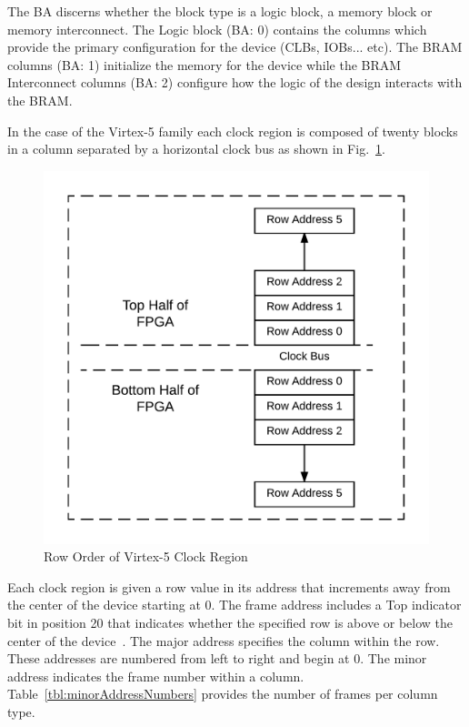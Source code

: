 \documentclass[conference]{IEEEtran}
\begin{document}
The \acrfull{BA} discerns whether the block type is a logic block, a memory block or memory interconnect.
The Logic block (BA: 0) contains the columns which provide the primary configuration for the device (\acrshort{CLBs}, \acrshort{IOBs}... etc).
The \acrshort{BRAM} columns (BA: 1) initialize the memory for the device while the \acrshort{BRAM} Interconnect columns (BA: 2) configure how the logic of the design interacts with the \acrshort{BRAM}.

In the case of the Virtex-5 family each clock region is composed of twenty blocks in a column separated by a horizontal clock bus as shown in Fig.~\ref{fig:RowOrder}.
\begin{figure}[h]
	\centering
	\includegraphics[width=1\linewidth]{../Thesis/Figures/RowOrder}
	\caption[Row Order of Virtex-5 Clock Region]{Row Order of Virtex-5 Clock Region}
	\label{fig:RowOrder}
\end{figure}

Each clock region is given a row value in its address that increments away from the center of the device starting at 0. 
The frame address includes a Top indicator bit in position 20 that indicates whether the specified row is above or below the center of the device~\cite{virtex5ConfigGuide}.
The major address specifies the column within the row.
These addresses are numbered from left to right and begin at 0.
The minor address indicates the frame number within a column. 
Table~\ref{tbl:minorAddressNumbers} provides the number of frames per column type.
\end{document}

